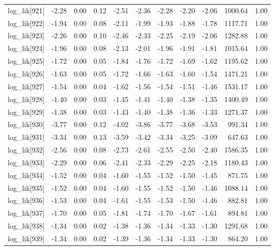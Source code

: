 \begin{table}[ht]
\begin{tabular}{rrrrrrrrrrr}
  log\_lik[921] & -2.28 & 0.00 & 0.12 & -2.51 & -2.36 & -2.28 & -2.20 & -2.06 & 1000.64 & 1.00 \\ 
  log\_lik[922] & -1.94 & 0.00 & 0.08 & -2.11 & -1.99 & -1.93 & -1.88 & -1.78 & 1117.71 & 1.00 \\ 
  log\_lik[923] & -2.26 & 0.00 & 0.10 & -2.46 & -2.33 & -2.25 & -2.19 & -2.06 & 1282.88 & 1.00 \\ 
  log\_lik[924] & -1.96 & 0.00 & 0.08 & -2.13 & -2.01 & -1.96 & -1.91 & -1.81 & 1015.64 & 1.00 \\ 
  log\_lik[925] & -1.72 & 0.00 & 0.05 & -1.84 & -1.76 & -1.72 & -1.69 & -1.62 & 1195.62 & 1.00 \\ 
  log\_lik[926] & -1.63 & 0.00 & 0.05 & -1.72 & -1.66 & -1.63 & -1.60 & -1.54 & 1471.21 & 1.00 \\ 
  log\_lik[927] & -1.54 & 0.00 & 0.04 & -1.62 & -1.56 & -1.54 & -1.51 & -1.46 & 1531.17 & 1.00 \\ 
  log\_lik[928] & -1.40 & 0.00 & 0.03 & -1.45 & -1.41 & -1.40 & -1.38 & -1.35 & 1400.49 & 1.00 \\ 
  log\_lik[929] & -1.38 & 0.00 & 0.03 & -1.43 & -1.40 & -1.38 & -1.36 & -1.33 & 1271.37 & 1.00 \\ 
  log\_lik[930] & -3.77 & 0.00 & 0.12 & -4.02 & -3.86 & -3.77 & -3.68 & -3.53 & 991.34 & 1.00 \\ 
  log\_lik[931] & -3.34 & 0.00 & 0.13 & -3.59 & -3.42 & -3.34 & -3.25 & -3.09 & 647.63 & 1.00 \\ 
  log\_lik[932] & -2.56 & 0.00 & 0.08 & -2.73 & -2.61 & -2.55 & -2.50 & -2.40 & 1586.35 & 1.00 \\ 
  log\_lik[933] & -2.29 & 0.00 & 0.06 & -2.41 & -2.33 & -2.29 & -2.25 & -2.18 & 1180.43 & 1.00 \\ 
  log\_lik[934] & -1.52 & 0.00 & 0.04 & -1.60 & -1.55 & -1.52 & -1.50 & -1.45 & 871.75 & 1.00 \\ 
  log\_lik[935] & -1.52 & 0.00 & 0.04 & -1.60 & -1.55 & -1.52 & -1.50 & -1.46 & 1088.14 & 1.00 \\ 
  log\_lik[936] & -1.53 & 0.00 & 0.04 & -1.61 & -1.55 & -1.53 & -1.50 & -1.46 & 882.81 & 1.00 \\ 
  log\_lik[937] & -1.70 & 0.00 & 0.05 & -1.81 & -1.74 & -1.70 & -1.67 & -1.61 & 894.81 & 1.00 \\ 
  log\_lik[938] & -1.34 & 0.00 & 0.02 & -1.38 & -1.36 & -1.34 & -1.33 & -1.30 & 1291.68 & 1.00 \\ 
  log\_lik[939] & -1.34 & 0.00 & 0.02 & -1.39 & -1.36 & -1.34 & -1.33 & -1.30 & 864.20 & 1.00 \\ 

\end{tabular}
\end{table}
